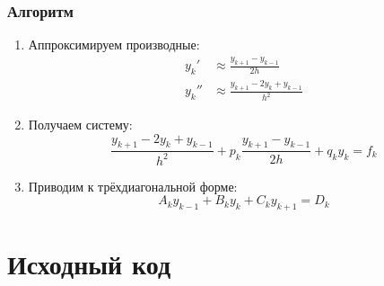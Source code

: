 \subsubsection*{Алгоритм}
\begin{enumerate}
    \item Аппроксимируем производные:
    \begin{align}
        y_k' &\approx \frac{y_{k+1} - y_{k-1}}{2h} \\
        y_k'' &\approx \frac{y_{k+1} - 2y_k + y_{k-1}}{h^2}
        \tag{4.37}
    \end{align}
    
    \item Получаем систему:
    \begin{equation}
        \frac{y_{k+1} - 2y_k + y_{k-1}}{h^2} + p_k \frac{y_{k+1} - y_{k-1}}{2h} + q_k y_k = f_k
        \tag{4.38}
    \end{equation}
    
    \item Приводим к трёхдиагональной форме:
    \begin{equation}
        A_k y_{k-1} + B_k y_k + C_k y_{k+1} = D_k
        \tag{4.39}
    \end{equation}
\end{enumerate}

\section*{Исходный код}

